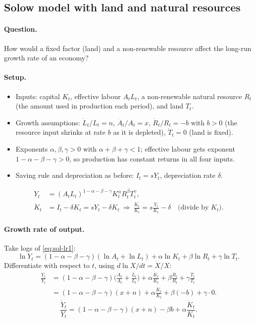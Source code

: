 \subsection{Solow model with land and natural resources }

\paragraph{Question.} How would a fixed factor (land) and a non-renewable resource affect the long-run growth rate of an economy?

\paragraph{Setup.}
\begin{itemize}
  \item Inputs: capital $K_t$, effective labour $A_tL_t$, a non-renewable natural resource $R_t$ (the amount used in production each period), and land $T_t$.
  \item Growth assumptions: $\dot L_t/L_t=n$, $\dot A_t/A_t=x$, $\dot R_t/R_t=-b$ with $b>0$ (the resource input shrinks at rate $b$ as it is depleted), $\dot T_t=0$ (land is fixed).
  \item Exponents $\alpha,\beta,\gamma>0$ with $\alpha+\beta+\gamma<1$; effective labour gets exponent $1-\alpha-\beta-\gamma>0$, so production has constant returns in all four inputs.
  \item Saving rule and depreciation as before: $I_t=sY_t$, depreciation rate $\delta$.
\end{itemize}
\begin{align}
Y_t&=(A_tL_t)^{1-\alpha-\beta-\gamma}K_t^{\alpha}R_t^{\beta}T_t^{\gamma}, \label{eq:sol-lr1}\\
\dot K_t&=I_t-\delta K_t=sY_t-\delta K_t\ \Longrightarrow\ \frac{\dot K_t}{K_t}=s\frac{Y_t}{K_t}-\delta \quad\text{(divide by $K_t$)}. \label{eq:sol-lr2}
\end{align}

\paragraph{Growth rate of output.} Take logs of \eqref{eq:sol-lr1}:
\[
\ln Y_t=(1-\alpha-\beta-\gamma)(\ln A_t+\ln L_t)+\alpha\ln K_t+\beta\ln R_t+\gamma\ln T_t .
\]
Differentiate with respect to $t$, using $d\ln X/dt=\dot X/X$:
\begin{align*}
\frac{\dot Y_t}{Y_t}&=(1-\alpha-\beta-\gamma)\Big(\frac{\dot A_t}{A_t}+\frac{\dot L_t}{L_t}\Big)+\alpha\frac{\dot K_t}{K_t}+\beta\frac{\dot R_t}{R_t}+\gamma\frac{\dot T_t}{T_t}\\
&=(1-\alpha-\beta-\gamma)(x+n)+\alpha\frac{\dot K_t}{K_t}+\beta(-b)+\gamma\cdot 0 .
\end{align*}
\begin{equation}\label{eq:sol-lr3}
\frac{\dot Y_t}{Y_t}=(1-\alpha-\beta-\gamma)(x+n)-\beta b+\alpha\frac{\dot K_t}{K_t}.
\end{equation}


